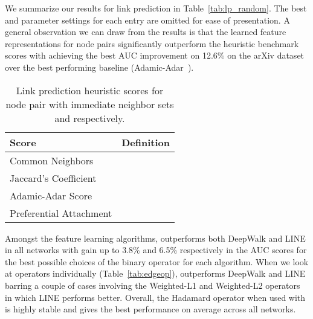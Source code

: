 We summarize our results for link prediction in Table~\ref{tab:lp_random}. The best  and  parameter settings for each \nodevec entry are omitted for ease of presentation. A general observation we can draw from the results is that the learned feature representations for node pairs significantly outperform the heuristic benchmark scores with \nodevec achieving the best AUC improvement on 12.6\% on the arXiv dataset over the best performing baseline (Adamic-Adar~\cite{adamicadar}). 

\begin{table}
\centering
\begin{tabular}{l|c}
\textbf{Score} & \textbf{Definition} \\ \hline
Common Neighbors &  \\
Jaccard's Coefficient &  \\
Adamic-Adar Score &  \\
Preferential Attachment & 
\end{tabular}
\vspace{-0.2cm}
\caption{Link prediction heuristic scores for node pair  with immediate neighbor sets  and  respectively.}
\label{tab:lp_scores}
\vspace{-0.4cm}
\end{table}

Amongst the feature learning algorithms, \nodevec outperforms both DeepWalk and LINE in all networks with gain up to 3.8\% and 6.5\% respectively in the AUC scores for the best possible choices of the binary operator for each algorithm. When we look at operators individually (Table~\ref{tab:edgeop}), \nodevec outperforms DeepWalk and LINE barring a couple of cases involving the Weighted-L1 and Weighted-L2 operators in which LINE performs better. Overall, the Hadamard operator when used with \nodevec is highly stable and gives the best performance on average across all networks. 

